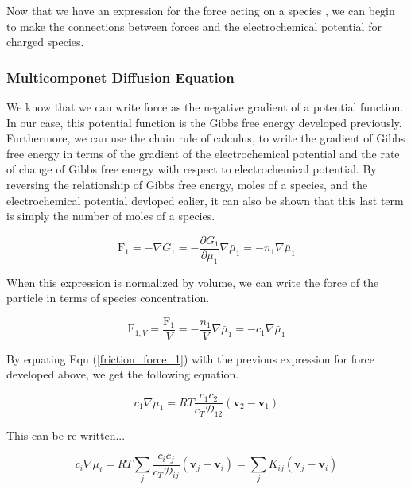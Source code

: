 \documentclass[lettersize,journal]{IEEEtran}
\begin{document}
Now that we have an expression for the force acting on a species , we can begin to make the connections between forces and the electrochemical potential for charged species. \\


\subsubsection{Multicomponet Diffusion Equation}

We know that we can write force as the negative gradient of a potential function. In our case, this potential function is the Gibbs free energy developed previously. Furthermore, we can use the chain rule of calculus, to write the gradient of Gibbs free energy in terms of the gradient of the electrochemical potential and the rate of change of Gibbs free energy with respect to electrochemical potential. By reversing the relationship of Gibbs free energy, moles of a species, and the electrochemical potential devloped ealier, it can also be shown that this last term is simply the number of moles of a species.

\begin{equation}
  \mathrm{F}_{1}=-\nabla G_{1}=-\frac{\partial G_{1}}{\partial \mu_{1}} \nabla \bar{\mu}_{1}=-n_{1} \nabla \bar{\mu}_{1}
\end{equation}

When this expression is normalized by volume, we can write the force of the particle in terms of species concentration.

\begin{equation}\label{friction_force_2}
  \mathrm{F}_{1, V}=\frac{\mathrm{F}_{1}}{V}=-\frac{n_{1}}{V} \nabla \bar{\mu}_{1}=-c_{1} \nabla \bar{\mu}_{1}
\end{equation}

By equating Eqn (\ref{friction_force_1}) with the previous expression for force developed above, we get the following equation.

\begin{equation}
  c_{1} \nabla \mu_{1}=R T \frac{c_{1} c_{2}}{c_{T} \mathscr{D}_{12}}\left(\mathbf{v}_{2}-\mathbf{v}_{1}\right)
\end{equation}

This can be re-written...

\begin{equation}
  c_{i} \nabla \mu_{i}=R T \sum_{j} \frac{c_{i} c_{j}}{c_{T} \mathscr{D}_{i j}}\left(\mathbf{v}_{j}-\mathbf{v}_{i}\right)=\sum_{j} K_{i j}\left(\mathbf{v}_{j}-\mathbf{v}_{i}\right)
\end{equation}
\end{document}
